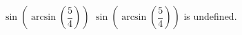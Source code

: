  {$\sin\left(\arcsin\left(\dfrac{5}{4}\right)\right)$ }
{ $\sin\left(\arcsin\left(\dfrac{5}{4}\right)\right)$ is undefined. }
